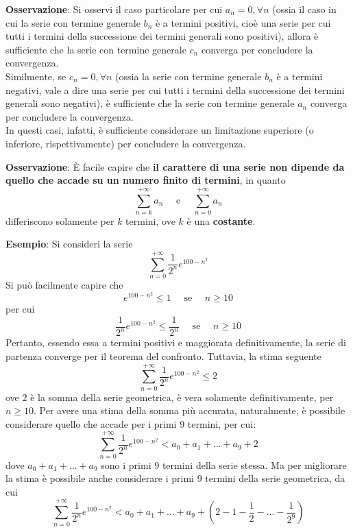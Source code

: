 \documentclass[a4paper]{extarticle}
\begin{document}
\vspace{1em}
\noindent
\textbf{Osservazione}: Si osservi il caso particolare per cui $a_n=0, \forall n$ (ossia il caso in cui la serie con termine generale $b_n$ è a termini positivi, cioè una serie per cui tutti i termini della successione dei termini generali sono positivi), allora è sufficiente che la serie con termine generale $c_n$ converga per concludere la convergenza.\\
Similmente, se $c_n=0, \forall n$ (ossia la serie con termine generale $b_n$ è a termini negativi, vale a dire una serie per cui tutti i termini della successione dei termini generali sono negativi), è sufficiente che la serie con termine generale $a_n$ converga per concludere la convergenza.\\
In questi casi, infatti, è sufficiente considerare un limitazione superiore (o inferiore, rispettivamente) per concludere la convergenza.

\vspace{1em}
\noindent
\textbf{Osservazione}: È facile capire che \textbf{il carattere di una serie non dipende da quello che accade su un numero finito di termini}, in quanto
\[\sum_{n=k}^{+\infty} a_n \hspace{1em} \text{ e } \hspace{1em} \sum_{n=0}^{+\infty} a_n\]
differiscono solamente per $k$ termini, ove $k$ è una \textbf{costante}.

\vspace{1em}
\noindent
\textbf{Esempio}: Si consideri la serie
\[\sum_{n=0}^{+\infty} \frac{1}{2^n} e^{100-n^2}\]
Si può facilmente capire che
\[e^{100-n^2} \leq 1 \hspace{1em} \text{ se } \hspace{1em} n \geq 10\]
per cui
\[\frac{1}{2^n} e^{100-n^2} \leq \frac{1}{2^n}  \hspace{1em} \text{ se } \hspace{1em} n \geq 10\]
Pertanto, essendo essa a termini positivi e maggiorata definitivamente, la serie di partenza converge per il teorema del confronto. Tuttavia, la stima seguente
\[\sum_{n=0}^{+\infty} \frac{1}{2^n} e^{100-n^2} \leq 2\]
ove $2$ è la somma della serie geometrica, è vera solamente definitivamente, per $n \geq 10$. Per avere una stima della somma più accurata, naturalmente, è possibile considerare quello che accade per i primi $9$ termini, per cui:
\[\sum_{n=0}^{+\infty} \frac{1}{2^n} e^{100-n^2} < a_0+a_1+\dots+a_9+2\]
dove $a_0+a_1+\dots+a_9$ sono i primi $9$ termini della serie stessa. Ma per migliorare la stima è possibile anche considerare i primi $9$ termini della serie geometrica, da cui
\[\sum_{n=0}^{+\infty} \frac{1}{2^n} e^{100-n^2} < a_0+a_1+\dots+a_9+\left(2-1-\frac{1}{2}-\dots-\frac{1}{2^9}\right)\]
\end{document}

